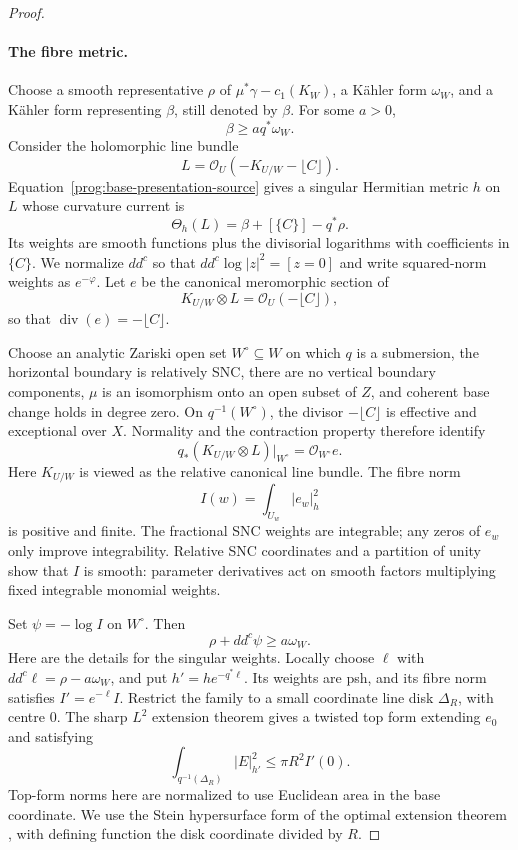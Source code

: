 \begin{proof}
\paragraph{The fibre metric.}
Choose a smooth representative $\rho$ of
$\mu^*\gamma-c_1(K_W)$, a K\"ahler form $\omega_W$, and a
K\"ahler form representing $\beta$, still denoted by $\beta$.
For some $a>0$,
\[
 \beta\geq a q^*\omega_W.
\]
Consider the holomorphic line bundle
\[
 L=\mathcal O_U(-K_{U/W}-\lfloor C\rfloor).
\]
Equation~\eqref{prog:base-presentation-source} gives a singular
Hermitian metric $h$ on $L$ whose curvature current is
\begin{equation}\label{prog:base-presentation-curvature}
 \Theta_h(L)=\beta+[\{C\}]-q^*\rho.
\end{equation}
Its weights are smooth functions plus the divisorial logarithms
with coefficients in $\{C\}$. We normalize $dd^c$ so that
$dd^c\log|z|^2=[z=0]$ and write squared-norm weights as $e^{-\varphi}$.
Let $e$ be the canonical meromorphic section of
\[
 K_{U/W}\otimes L=\mathcal O_U(-\lfloor C\rfloor),
\]
so that $\operatorname{div}(e)=-\lfloor C\rfloor$.

Choose an analytic Zariski open set $W^\circ\subseteq W$ on which
$q$ is a submersion, the horizontal boundary is relatively SNC,
there are no vertical boundary components, $\mu$ is an isomorphism
onto an open subset of $Z$, and coherent base change holds in degree
zero. On $q^{-1}(W^\circ)$, the divisor $-\lfloor C\rfloor$ is
effective and exceptional over $X$. Normality and the contraction
property therefore identify
\[
 q_*(K_{U/W}\otimes L)|_{W^\circ}
       =\mathcal O_{W^\circ}e.
\]
Here $K_{U/W}$ is viewed as the relative canonical line bundle. The
fibre norm
\[
 I(w)=\int_{U_w}|e_w|_h^2
\]
is positive and finite. The fractional SNC weights are integrable;
any zeros of $e_w$ only improve integrability. Relative SNC
coordinates and a partition of unity show that $I$ is smooth:
parameter derivatives act on smooth factors multiplying fixed
integrable monomial weights.

Set $\psi=-\log I$ on $W^\circ$. Then
\begin{equation}\label{prog:base-presentation-open-positivity}
 \rho+dd^c\psi\geq a\omega_W.
\end{equation}
Here are the details for the singular weights. Locally choose
$\ell$ with $dd^c\ell=\rho-a\omega_W$, and put
$h'=he^{-q^*\ell}$. Its weights are psh, and its fibre norm satisfies
$I'=e^{-\ell}I$. Restrict the family to a small coordinate line disk
$\Delta_R$, with centre $0$. The sharp $L^2$ extension theorem gives
a twisted top form extending $e_0$ and satisfying
\begin{equation}\label{prog:base-presentation-sharp-extension}
 \int_{q^{-1}(\Delta_R)}|E|_{h'}^2
        \leq\pi R^2 I'(0).
\end{equation}
Top-form norms here are normalized to use Euclidean area in the
base coordinate. We use the Stein hypersurface form of the optimal
extension theorem \cite[Theorem~2.2 and \S3.5, (3.1)]{GuanZhouOptimal2015},
with defining function the disk coordinate divided by $R$.


\end{proof}
